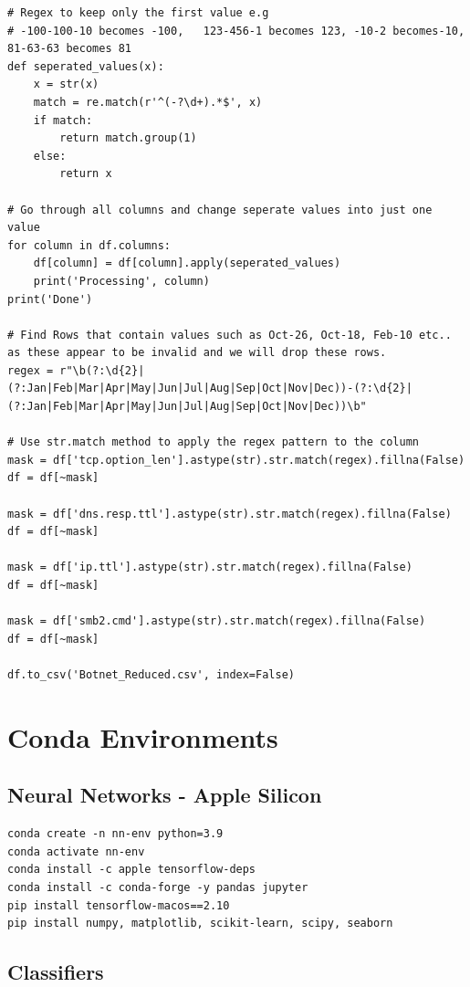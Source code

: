 \begin{appendices}
\begin{lstlisting}
# Regex to keep only the first value e.g 
# -100-100-10 becomes -100,   123-456-1 becomes 123, -10-2 becomes-10, 81-63-63 becomes 81
def seperated_values(x):
    x = str(x)
    match = re.match(r'^(-?\d+).*$', x)
    if match:
        return match.group(1)
    else:
        return x

# Go through all columns and change seperate values into just one value
for column in df.columns:
    df[column] = df[column].apply(seperated_values)
    print('Processing', column)
print('Done')

# Find Rows that contain values such as Oct-26, Oct-18, Feb-10 etc.. as these appear to be invalid and we will drop these rows.
regex = r"\b(?:\d{2}|(?:Jan|Feb|Mar|Apr|May|Jun|Jul|Aug|Sep|Oct|Nov|Dec))-(?:\d{2}|(?:Jan|Feb|Mar|Apr|May|Jun|Jul|Aug|Sep|Oct|Nov|Dec))\b"

# Use str.match method to apply the regex pattern to the column
mask = df['tcp.option_len'].astype(str).str.match(regex).fillna(False)
df = df[~mask]

mask = df['dns.resp.ttl'].astype(str).str.match(regex).fillna(False)
df = df[~mask]

mask = df['ip.ttl'].astype(str).str.match(regex).fillna(False)
df = df[~mask]

mask = df['smb2.cmd'].astype(str).str.match(regex).fillna(False)
df = df[~mask]

df.to_csv('Botnet_Reduced.csv', index=False)    

\end{lstlisting}

\newpage

\section{Conda Environments}
\label{appx: Conda_Env}

\subsection{Neural Networks - Apple Silicon}

\begin{lstlisting}
conda create -n nn-env python=3.9
conda activate nn-env
conda install -c apple tensorflow-deps
conda install -c conda-forge -y pandas jupyter
pip install tensorflow-macos==2.10
pip install numpy, matplotlib, scikit-learn, scipy, seaborn
\end{lstlisting}

\subsection{Classifiers}


\end{appendices}
